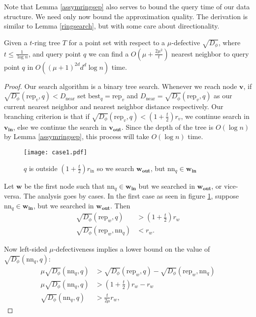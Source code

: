 \documentclass[11pt]{myclass}
\newcommand{\breg}{\ensuremath{D_\phi}}
\begin{document}
Note that Lemma \ref{assymringsep} also serves to bound the query time of our data structure. We need only now bound the approximation quality.
The derivation is similar to Lemma \ref{ringsearch}, but with some care about directionality. 


\begin{lemma}\label{ringsearchassym}
Given a $t$-ring tree $T$ for a point set with respect to a $\mu$-defective  $\sqrt{\breg}$, where $t \leq \frac{1}{\log n}$, and query point $q$ we can find a $O(\mu + \frac{2 \mu^2 }{t})$ nearest neighbor  to query point $q$ in $O( (\mu+1)^{2d} d^d \log n)$ time.
\end{lemma}

\begin{proof}
Our search algorithm is a binary tree search. Whenever we reach node $\textbf{v}$, if $\sqrt{\breg}(\text{rep}_v,q) < D_{\text{near}}$ 
set $\text{best}_q =\text{rep}_v$ and $D_{\text{near}} = \sqrt{\breg}(\text{rep}_v,q)$ as our current 
nearest neighbor and nearest neighbor distance respectively.  
Our branching criterion is that if  $\sqrt{\breg} (\text{rep}_v, q) < (1 + \frac{t}{2}) r_v$, we
 continue search in $\mathbf{v_{\text{in}}}$, else we continue the  
search in $\mathbf{v_{\text{out}}}$. Since the depth of the tree is $O(\log n)$ by Lemma \ref{assymringsep}, 
this process will take $O(\log n)$ time.
\begin{figure}[H]
  \begin{center}
    \texttt{[image: case1.pdf]}
  \end{center}
  \caption{$q$ is outside $(1+\frac{t}{2})r_{\text{in}}$ so we search $\mathbf{w_{\text{out}}}$, but $\text{nn}_q \in \mathbf{w_{\text{in} }}$}
  \label{case1}
\end{figure}
 Let $\textbf{w}$ be the first node such that $\text{nn}_q \in \mathbf{w_{\text{in}}}$ but we searched in $\mathbf{w_{\text{out}}}$, or vice-versa. 
The analysis goes by cases. In the first case as seen in figure \ref{case1}, suppose $\text{nn}_q \in \mathbf{w_{\text{in}}}$, but we searched in $\mathbf{w_{\text{out}}}$.
Then
\begin{align*}
\sqrt{\breg}(\text{rep}_w, q) &> \left( 1 + \frac{t}{2} \right) r_w 
\\ \sqrt{\breg}(\text{rep}_w, \text{nn}_q) &< r_w.
\end{align*}

Now left-sided $\mu$-defectiveness implies a lower bound on the value of $\sqrt{\breg}(\text{nn}_q,q)$:
\begin{align*}
\mu \sqrt{\breg}(\text{nn}_q, q) &> \sqrt{\breg} (\text{rep}_w, q) - \sqrt{\breg}(\text{rep}_w, \text{nn}_q) 
\\ \mu \sqrt{\breg}(\text{nn}_q,q) &> \left( 1+ \frac{t}{2} \right) r_w - r_w 
\\ \sqrt{\breg}(\text{nn}_q,q) &>  \frac{t}{2 \mu} r_w,
\end{align*}


\end{proof}
\end{document}
